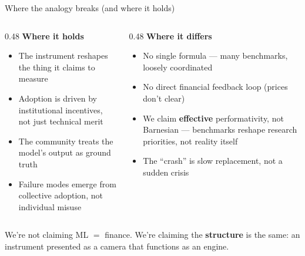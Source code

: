 \documentclass[aspectratio=169,11pt]{beamer}
\begin{document}
\begin{frame}{Where the analogy breaks (and where it holds)}

\begin{columns}[T]
\begin{column}{0.48\textwidth}
\textbf{Where it holds}
\begin{itemize}\setlength\itemsep{4pt}
  \item {\small The instrument reshapes the thing it claims to measure}
  \item {\small Adoption is driven by institutional incentives, not just technical merit}
  \item {\small The community treats the model's output as ground truth}
  \item {\small Failure modes emerge from collective adoption, not individual misuse}
\end{itemize}
\end{column}
\begin{column}{0.48\textwidth}
\textbf{Where it differs}
\begin{itemize}\setlength\itemsep{4pt}
  \item {\small No single formula --- many benchmarks, loosely coordinated}
  \item {\small No direct financial feedback loop (prices don't clear)}
  \item {\small We claim \textbf{effective} performativity, not Barnesian --- benchmarks reshape research priorities, not reality itself}
  \item {\small The ``crash'' is slow replacement, not a sudden crisis}
\end{itemize}
\end{column}
\end{columns}

\vspace{0.5em}
{\small We're not claiming ML $=$ finance. We're claiming the \textbf{structure} is the same: an instrument presented as a camera that functions as an engine.}
\end{frame}
\end{document}
